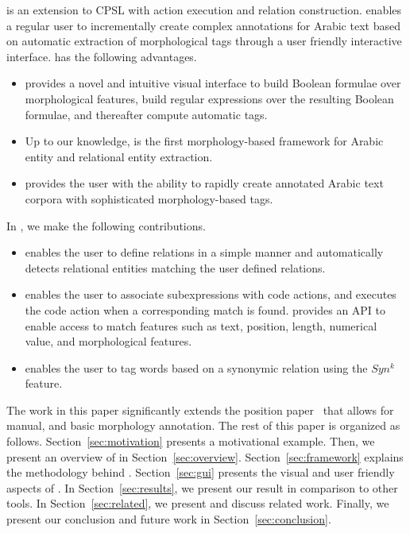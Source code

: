 \framework is an extension to CPSL with action execution and relation construction. 
\framework enables a regular user to incrementally create 
complex annotations for Arabic text based on automatic 
extraction of morphological tags through a user friendly interactive interface. 
\framework has the following advantages.
\begin{itemize}
  \item \framework provides a novel and intuitive visual interface to build Boolean formulae over morphological features, 
    build regular expressions over the resulting Boolean formulae, and thereafter compute automatic tags.
  \item Up to our knowledge, \framework  is the first morphology-based framework for Arabic entity and relational entity extraction.
  \item \framework provides the user with the ability to rapidly create annotated Arabic text corpora with sophisticated morphology-based tags.
\end{itemize}

In \framework, we make the following contributions.
\begin{itemize}
  \item \framework enables the user to define relations in a simple manner
    and automatically detects relational entities matching the user defined relations. 
  \item \framework enables the user to associate subexpressions
    with code actions, and executes the code action 
    when a corresponding match is found. 
    \framework provides an API to enable access to match 
    features such as text, position, length, numerical value, and morphological features.
  \item \framework enables the user to tag words based on a synonymic relation using the $Syn^k$ feature.
\end{itemize}

The work in this paper significantly extends the position 
paper~\cite{JaZaMatar} that allows for manual, and 
basic morphology annotation. 
The rest of this paper is organized as follows. 
Section~\ref{sec:motivation} presents a motivational example. 
Then, we present an overview of \framework in Section~\ref{sec:overview}. 
Section~\ref{sec:framework} explains the methodology behind \framework. 
Section~\ref{sec:gui} presents the visual and user friendly aspects of \framework. 
In Section~\ref{sec:results}, we present our result in comparison to other tools. 
In Section~\ref{sec:related}, we present and discuss related work. 
Finally, we present our conclusion and future work in Section~\ref{sec:conclusion}.
